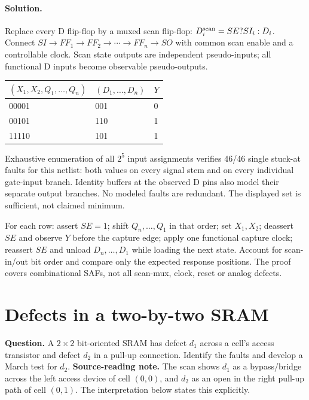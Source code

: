 \documentclass[11pt]{article}
\newcommand{\sol}{\paragraph{Solution.}}
\begin{document}
\sol Replace every D flip-flop by a muxed scan flip-flop:
$D_i^{\rm scan}=SE?SI_i:D_i$.
Connect $SI\to FF_1\to FF_2\to\cdots\to FF_n\to SO$ with common scan enable
and a controllable clock. Scan state outputs are independent pseudo-inputs;
all functional D inputs become observable pseudo-outputs.
\begin{center}\begin{tabular}{lll}\toprule $(X_1,X_2,Q_1,\ldots,Q_n)$ & $(D_1,\ldots,D_n)$ & $Y$\\\midrule
00001 & 001 & 0\\
00101 & 110 & 1\\
11110 & 101 & 1\\
\bottomrule\end{tabular}\end{center}
Exhaustive enumeration of all $2^{5}$ input assignments verifies
46/46 single stuck-at faults for this netlist:
both values on every signal stem and on every individual gate-input branch.
Identity buffers at the observed D pins also model their separate output branches.
No modeled faults are redundant. The displayed set is sufficient, not claimed minimum.

For each row: assert $SE=1$; shift $Q_n,\ldots,Q_1$ in that order;
set $X_1,X_2$; deassert $SE$ and observe $Y$ before the capture edge;
apply one functional capture clock; reassert $SE$ and unload
$D_n,\ldots,D_1$ while loading the next state.
Account for scan-in/out bit order and compare only the expected response positions.
The proof covers combinational SAFs, not all scan-mux, clock, reset or analog defects.

\section{Defects in a two-by-two SRAM}
\textbf{Question.} A $2\times2$ bit-oriented SRAM has defect $d_1$ across a
cell's access transistor and defect $d_2$ in a pull-up connection.
Identify the faults and develop a March test for $d_2$.
\textbf{Source-reading note.} The scan shows $d_1$ as a bypass/bridge across
the left access device of cell $(0,0)$, and $d_2$ as an open in the right
pull-up path of cell $(0,1)$. The interpretation below states this explicitly.
\begin{center}\end{center}
\end{document}
